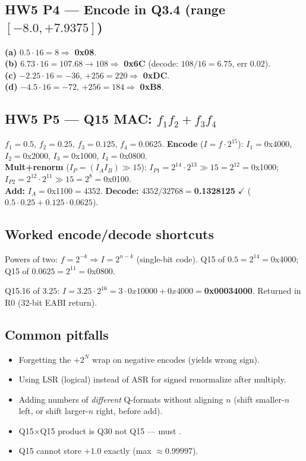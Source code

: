 \subsection{HW5 P4 --- Encode in Q3.4 (range $[-8.0,+7.9375]$)}
\begin{hwp}
\textbf{(a)} $0.5\cdot 16=8 \Rightarrow$ \textbf{0x08}.\\
\textbf{(b)} $6.73\cdot 16 = 107.68 \to 108 \Rightarrow$ \textbf{0x6C}
(decode: $108/16=6.75$, err $0.02$).\\
\textbf{(c)} $-2.25\cdot 16=-36$, $+256=220 \Rightarrow$ \textbf{0xDC}.\\
\textbf{(d)} $-4.5\cdot 16=-72$, $+256=184 \Rightarrow$ \textbf{0xB8}.
\end{hwp}

\subsection{HW5 P5 --- Q15 MAC: $f_1f_2+f_3f_4$}
\begin{hwp}
$f_1{=}0.5,\,f_2{=}0.25,\,f_3{=}0.125,\,f_4{=}0.0625$.
\textbf{Encode} ($I{=}f\cdot 2^{15}$): \;
$I_1{=}$0x4000, $I_2{=}$0x2000, $I_3{=}$0x1000, $I_4{=}$0x0800.\\
\textbf{Mult+renorm} ($I_P=(I_AI_B)\!\gg\!15$):
$I_{P1}=2^{14}\!\cdot\!2^{13}\!\gg\!15=2^{12}=$0x1000;
$I_{P2}=2^{12}\!\cdot\!2^{11}\!\gg\!15=2^{8}=$0x0100.\\
\textbf{Add:} $I_A=$0x1100$=4352$.
\textbf{Decode:} $4352/32768=$\textbf{0.1328125} $\checkmark$
($0.5\!\cdot\!0.25+0.125\!\cdot\!0.0625$).
\end{hwp}

\subsection{Worked encode/decode shortcuts}
\begin{ex}
Powers of two: $f=2^{-k}\Rightarrow I=2^{n-k}$ (single-bit code).
Q15 of $0.5=2^{14}=$0x4000; Q15 of $0.0625=2^{11}=$0x0800.
\end{ex}

\begin{ex}
Q15.16 of $3.25$: $I=3.25\cdot 2^{16}=3\cdot 0x10000+0x4000=$\textbf{0x00034000}.
Returned in R0 (32-bit EABI return).
\end{ex}

\subsection{Common pitfalls}
\begin{itemize}
\item Forgetting the $+2^{N}$ wrap on negative encodes (yields wrong sign).
\item Using LSR (logical) instead of ASR for signed renormalize after multiply.
\item Adding numbers of \emph{different} Q-formats without aligning $n$
(shift smaller-$n$ left, or shift larger-$n$ right, before add).
\item Q15$\times$Q15 product is Q30 not Q15 --- must .
\item Q15 cannot store $+1.0$ exactly (max $\approx 0.99997$).
\end{itemize}

